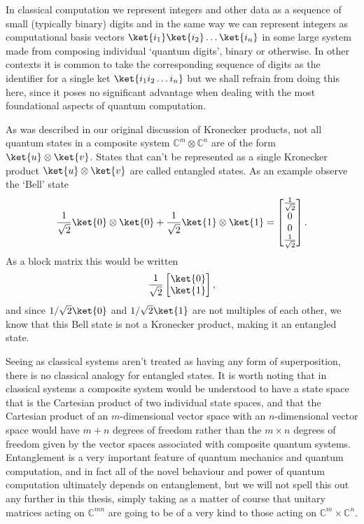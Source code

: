 In classical computation we represent integers and other data as a sequence of small (typically binary) digits and in the same way we can represent integers as computational basis vectors $\ket{i_1}\ket{i_2}\dots\ket{i_n}$ in some large system made from composing individual `quantum digits', binary or otherwise. In other contexts it is common to take the corresponding sequence of digits as the identifier for a single ket $\ket{i_1i_2\dots i_n}$ but we shall refrain from doing this here, since it poses no significant advantage when dealing with the most foundational aspects of quantum computation.

As was described in our original discussion of Kronecker products, not all quantum states in a composite system $\mathbb{C}^m\otimes\mathbb{C}^n$ are of the form $\ket{u}\otimes\ket{v}$. States that can't be represented as a single Kronecker product $\ket{u}\otimes\ket{v}$ are called entangled states. As an example observe the `Bell' state
\[\frac{1}{\sqrt{2}}\ket{0}\otimes\ket{0} + \frac{1}{\sqrt{2}}\ket{1}\otimes\ket{1} = \left[\begin{matrix}
\frac{1}{\sqrt{2}}\\
0\\
0\\
\frac{1}{\sqrt{2}}
\end{matrix}\right].\]
As a block matrix this would be written
\[\frac{1}{\sqrt{2}}\begin{bmatrix}
\ket{0} \\
\ket{1}
\end{bmatrix},\]
and since $1/\sqrt{2}\ket{0}$ and $1/\sqrt{2}\ket{1}$ are not multiples of each other, we know that this Bell state is not a Kronecker product, making it an entangled state.

Seeing as classical systems aren't treated as having any form of superposition, there is no classical analogy for entangled states. It is worth noting that in classical systems a composite system would be understood to have a state space that is the Cartesian product of two individual state spaces, and that the Cartesian product of an $m$-dimensional vector space with an $n$-dimensional vector space would have $m+n$ degrees of freedom rather than the $m\times n$ degrees of freedom given by the vector spaces associated with composite quantum systems.  Entanglement is a very important feature of quantum mechanics and quantum computation, and in fact all of the novel behaviour and power of quantum computation ultimately depends on entanglement, but we will not spell this out any further in this thesis, simply taking as a matter of course that unitary matrices acting on $\mathbb{C}^{mn}$ are going to be of a very kind to those acting on $\mathbb{C}^m\times \mathbb{C}^n$. 
